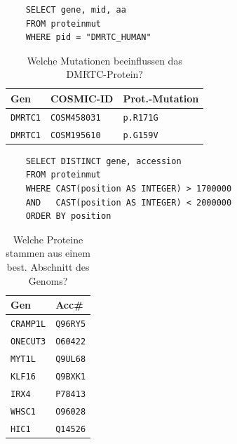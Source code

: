 \documentclass{scrartcl}
\begin{document}
\begin{table}[H]
	\noindent\begin{minipage}{.5\hsize}
	\begin{verbatim}
	SELECT gene, mid, aa
	FROM proteinmut
	WHERE pid = "DMRTC_HUMAN"
	\end{verbatim}
	\end{minipage}
	\begin{minipage}{.5\hsize}
	\hfill\begin{tabular}{lll}
	\toprule
	Gen&COSMIC-ID&Prot.-Mutation\\
	\midrule
	\texttt{DMRTC1}&\texttt{COSM458031}&\texttt{p.R171G} \\
	\texttt{DMRTC1}&\texttt{COSM195610}&\texttt{p.G159V} \\
	\bottomrule
	\end{tabular}
	\end{minipage}
	\caption{Welche Mutationen beeinflussen das DMRTC-Protein?}\label{q2}
\end{table}

\begin{table}[H]
	\noindent\begin{minipage}{.65\hsize}
	\begin{verbatim}
	SELECT DISTINCT gene, accession
	FROM proteinmut
	WHERE CAST(position AS INTEGER) > 1700000
	AND   CAST(position AS INTEGER) < 2000000
	ORDER BY position
	\end{verbatim}
	\end{minipage}
	\begin{minipage}{.35\hsize}
	\hfill\begin{tabular}{ll}
	\toprule
	Gen & Acc\# \\
	\midrule
	\texttt{CRAMP1L}&\texttt{Q96RY5}\\
	\texttt{ONECUT3}&\texttt{O60422}\\
	\texttt{MYT1L}&\texttt{Q9UL68}\\
	\texttt{KLF16}&\texttt{Q9BXK1}\\
	\texttt{IRX4}&\texttt{P78413}\\
	\texttt{WHSC1}&\texttt{O96028}\\
	\texttt{HIC1}&\texttt{Q14526}\\
	\bottomrule
	\end{tabular}
	\end{minipage}
	\caption{Welche Proteine stammen aus einem best. Abschnitt des Genoms?}\label{q3}
\end{table}
\end{document}
